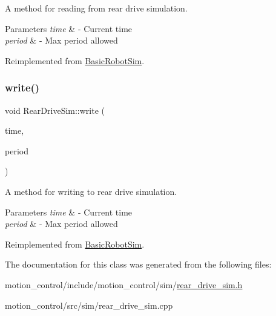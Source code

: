 A method for reading from rear drive simulation. 


\begin{DoxyParams}{Parameters}
{\em time} & -\/ Current time \\
\hline
{\em period} & -\/ Max period allowed \\
\hline
\end{DoxyParams}


Reimplemented from \hyperlink{classBasicRobotSim_a8e6a778a8f79818f01dcf0211a3b8e3f}{Basic\+Robot\+Sim}.

\mbox{\label{classRearDriveSim_a814f528a26c9dcf0b0d3490883abb2d2}} 
\subsubsection{\texorpdfstring{write()}{write()}}
{\footnotesize\ttfamily void Rear\+Drive\+Sim\+::write (\begin{DoxyParamCaption}\item[{const ros\+::\+Time \&}]{time,  }\item[{const ros\+::\+Duration \&}]{period }\end{DoxyParamCaption})\hspace{0.3cm}{\ttfamily [virtual]}}



A method for writing to rear drive simulation. 


\begin{DoxyParams}{Parameters}
{\em time} & -\/ Current time \\
\hline
{\em period} & -\/ Max period allowed \\
\hline
\end{DoxyParams}


Reimplemented from \hyperlink{classBasicRobotSim_aa05ea705c931dacabb1e47d9ebab3174}{Basic\+Robot\+Sim}.



The documentation for this class was generated from the following files\+:\begin{DoxyCompactItemize}
\item 
motion\+\_\+control/include/motion\+\_\+control/sim/\hyperlink{rear__drive__sim_8h}{rear\+\_\+drive\+\_\+sim.\+h}\item 
motion\+\_\+control/src/sim/rear\+\_\+drive\+\_\+sim.\+cpp\end{DoxyCompactItemize}
